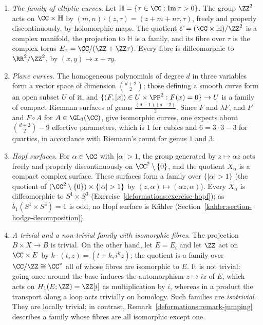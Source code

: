 \begin{example}\label{deformations:example-families}
\begin{enumerate}
\item \emph{The family of elliptic curves.} Let $\mathbb{H} = \{\tau \in \CC : \operatorname{Im}\tau > 0\}$. The group $\ZZ^2$ acts on $\CC \times \mathbb{H}$ by
$(m, n)\cdot(z, \tau) = (z + m + n\tau, \tau)$, freely and properly discontinuously, by holomorphic maps. The quotient $\mathcal{E} = (\CC \times \mathbb{H})/\ZZ^2$ is a complex manifold, the projection
to $\mathbb{H}$ is a family, and its fibre over $\tau$ is the complex torus $E_\tau = \CC/(\ZZ + \ZZ\tau)$. Every fibre is diffeomorphic to $\RR^2/\ZZ^2$, by $(x, y) \mapsto x + \tau y$.
\item \emph{Plane curves.} The homogeneous polynomials of degree $d$ in three variables form a vector space of dimension $\binom{d+2}{2}$; those defining a smooth curve form an open subset $U$ of it, and
$\{(F, [x]) \in U \times \PP^2 : F(x) = 0\} \to U$ is a family of compact Riemann surfaces of genus $\frac{(d-1)(d-2)}{2}$. Since $F$ and $\lambda F$, and $F$ and $F \circ A$ for $A \in \GL_3(\CC)$, give
isomorphic curves, one expects about $\binom{d+2}{2} - 9$ effective parameters, which is $1$ for cubics and $6 = 3 \cdot 3 - 3$ for quartics, in accordance with Riemann's count for genus $1$ and $3$.
\item \emph{Hopf surfaces.} For $\alpha \in \CC$ with $|\alpha| > 1$, the group generated by $z \mapsto \alpha z$ acts freely and properly discontinuously on $\CC^2 \setminus \{0\}$, and the quotient $X_\alpha$
is a compact complex surface. These surfaces form a family over $\{|\alpha| > 1\}$ (the quotient of $(\CC^2 \setminus \{0\}) \times \{|\alpha| > 1\}$ by $(z, \alpha) \mapsto (\alpha z, \alpha)$). Every
$X_\alpha$ is diffeomorphic to $S^1 \times S^3$ (Exercise~\ref{deformations:exercise-hopf}); as $b_1(S^1 \times S^3) = 1$ is odd, no Hopf surface is K\"ahler (Section~\ref{kahler:section-hodge-decomposition}).
\item \emph{A trivial and a non-trivial family with isomorphic fibres.} The projection $B \times X \to B$ is trivial. On the other hand, let $E = E_i$ and let $\ZZ$ act on $\CC \times E$ by
$k\cdot(t, z) = (t + k, i^kz)$; the quotient is a family over $\CC/\ZZ \cong \CC^*$ all of whose fibres are isomorphic to $E$. It is not trivial: going once around the base induces the automorphism
$z \mapsto iz$ of $E$, which acts on $H_1(E; \ZZ) = \ZZ[i]$ as multiplication by $i$, whereas in a product the transport along a loop acts trivially on homology. Such families are \emph{isotrivial}. They are locally trivial; in contrast, Remark~\ref{deformations:remark-jumping} describes a family whose fibres are all isomorphic except one.
\end{enumerate}
\end{example}

